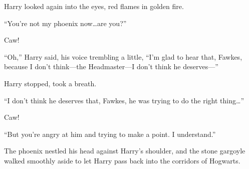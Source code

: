 Harry looked again into the eyes, red flames in golden fire.

“You’re not my phoenix now…are you?”

Caw!

“Oh,” Harry said, his voice trembling a little, “I’m glad to hear that, Fawkes, because I don’t think—the Headmaster—I don’t think he deserves—”

Harry stopped, took a breath.

“I don’t think he deserves that, Fawkes, he was trying to do the right thing…”

Caw!

“But you’re angry at him and trying to make a point. I understand.”

The phoenix nestled his head against Harry’s shoulder, and the stone gargoyle walked smoothly aside to let Harry pass back into the corridors of Hogwarts.
